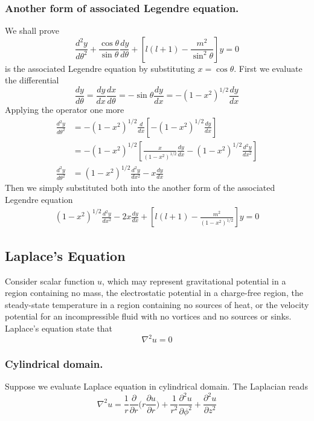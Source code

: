 \documentclass[../main.tex]{subfiles}
\begin{document}
\subsubsection*{Another form of associated Legendre equation.} We shall prove
\begin{equation*}
    \frac{d^2y}{d\theta^2} +\frac{\cos \theta}{\sin\theta}\frac{dy}{d\theta} +\left[l(l+1)-\frac{m^2}{\sin^2\theta} \right]y =0
\end{equation*}
is the associated Legendre equation by substituting $x=\cos\theta$. First we evaluate the differential
\begin{equation*}
    \frac{dy}{d\theta}=\frac{dy}{dx}\frac{dx}{d\theta}=-\sin\theta\frac{dy}{dx}=-(1-x^2)^{1/2}\frac{dy}{dx}
\end{equation*}
Applying the operator one more 
\begin{align*}
    \frac{d^2y}{d\theta^2}&=-(1-x^2)^{1/2}\frac{d}{dx}\left[-(1-x^2)^{1/2}\frac{dy}{dx}\right]\\
    &=-(1-x^2)^{1/2}\left[\frac{x}{(1-x^2)^{1/2}}\frac{dy}{dx} -(1-x^2)^{1/2}\frac{d^2y}{dx^2}\right]\\
    \frac{d^2y}{d\theta^2}&=(1-x^2)^{1/2}\frac{d^2y}{dx^2}-x\frac{dy}{dx}
\end{align*}
Then we simply substituted both into the another form of the associated Legendre equation
\begin{align*}
    (1-x^2)^{1/2}\frac{d^2y}{dx^2}-2x\frac{dy}{dx}+\left[l(l+1)-\frac{m^2}{(1-x^2)^{1/2}} \right]y=0
\end{align*} 

\subsection*{Laplace's Equation}
Consider scalar function $u$, which may represent gravitational potential in a region containing no mass, the electrostatic potential in a charge-free region, the steady-state temperature in a region containing no sources of heat, or the velocity potential for an incompressible fluid with no vortices and no sources or sinks. Laplace's equation state that 
\begin{equation*}
    \nabla^2 u=0
\end{equation*}


\subsubsection*{Cylindrical domain.} Suppose we evaluate Laplace equation in cylindrical domain. The Laplacian reads
\begin{equation*}
    \nabla^2u= \frac{1}{r}\frac{\partial}{\partial r}\Biggl(r\frac{\partial u}{\partial r}\Biggr)+\frac{1}{r^2} \frac{\partial^2u}{\partial \phi^2}+ \frac{\partial^2u}{\partial z^2}
\end{equation*}
\end{document}

